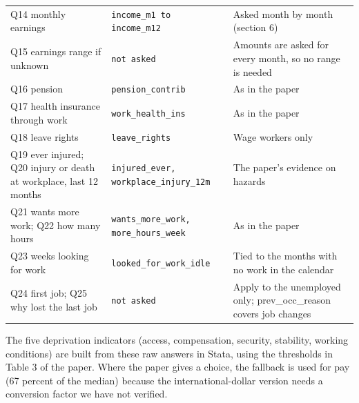 \documentclass[10pt]{article}
\begin{document}
{\begin{longtable}{p{5cm}p{4.6cm}p{6.7cm}}
Q14 monthly earnings & \texttt{income\_m1 to income\_m12} & Asked month by month (section 6) \\
Q15 earnings range if unknown & \texttt{not asked} & Amounts are asked for every month, so no range is needed \\
Q16 pension & \texttt{pension\_contrib} & As in the paper \\
Q17 health insurance through work & \texttt{work\_health\_ins} & As in the paper \\
Q18 leave rights & \texttt{leave\_rights} & Wage workers only \\
Q19 ever injured; Q20 injury or death at workplace, last 12 months & \texttt{injured\_ever, workplace\_injury\_12m} & The paper's evidence on hazards \\
Q21 wants more work; Q22 how many hours & \texttt{wants\_more\_work, more\_hours\_week} & As in the paper \\
Q23 weeks looking for work & \texttt{looked\_for\_work\_idle} & Tied to the months with no work in the calendar \\
Q24 first job; Q25 why lost the last job & \texttt{not asked} & Apply to the unemployed only; prev\_occ\_reason covers job changes \\
\bottomrule
\end{longtable}
}

The five deprivation indicators (access, compensation, security, stability, working conditions) are built from these raw answers in Stata, using the thresholds in Table 3 of the paper.
Where the paper gives a choice, the fallback is used for pay (67 percent of the median) because the international-dollar version needs a conversion factor we have not verified.
\end{document}
